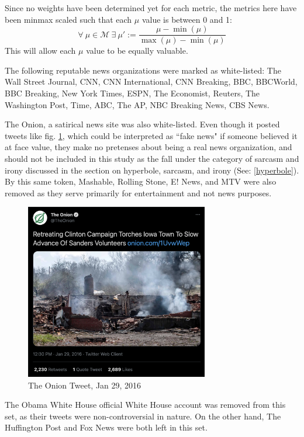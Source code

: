 \documentclass[preprint,review,12pt]{elsarticle}
\begin{document}
Since no weights have been determined yet for each metric, the metrics here have been minmax scaled such that each $\mu$ value is between 0 and 1: 
\[
\forall \ \mu \in \mathcal{M} \  \exists \ \mu' := \frac{\mu - \min(\mu)}{\max(\mu) - \min(\mu)} 
\]
This will allow each $\mu$ value to be equally valuable.

The following reputable news organizations were marked as white-listed: The Wall Street Journal, CNN, CNN International, CNN Breaking, BBC, BBCWorld, BBC Breaking, New York Times, ESPN, The Economist, Reuters, The Washington Post, Time, ABC, The AP, NBC Breaking News, CBS News.

The Onion, a satirical news site was also white-listed. Even though it posted tweets like fig. \ref{fig:The Onion Tweet, Jan 29, 2016}, which could be interpreted as ``fake news" if someone believed it at face value, they make no pretenses about being a real news organization, and should not be included in this study as the fall under the category of sarcasm and irony discussed in the section on hyperbole, sarcasm, and irony (See: \ref{hyperbole}). By this same token, Mashable, Rolling Stone, E! News, and MTV were also removed as they serve primarily for entertainment and not news purposes.
\begin{figure}[h]
    \centering
    \includegraphics[width=8cm]{Onion Tweet.png}
    \caption{The Onion Tweet, Jan 29, 2016 \cite{onion2016tweet}}
    \label{fig:The Onion Tweet, Jan 29, 2016}
\end{figure}

The Obama White House official White House account was removed from this set, as their tweets were non-controversial in nature. On the other hand, The Huffington Post and Fox News were both left in this set.
\end{document}
